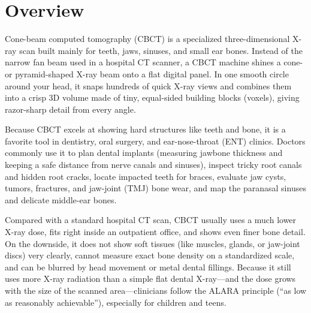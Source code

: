 \label{ch:infographic-cbct}

\section{Overview}

Cone-beam computed tomography (CBCT) is a specialized three-dimensional X-ray scan built mainly for teeth, jaws, sinuses, and small ear bones. Instead of the narrow fan beam used in a hospital CT scanner, a CBCT machine shines a cone- or pyramid-shaped X-ray beam onto a flat digital panel. In one smooth circle around your head, it snaps hundreds of quick X-ray views and combines them into a crisp 3D volume made of tiny, equal-sided building blocks (voxels), giving razor-sharp detail from every angle.

Because CBCT excels at showing hard structures like teeth and bone, it is a favorite tool in dentistry, oral surgery, and ear-nose-throat (ENT) clinics. Doctors commonly use it to plan dental implants (measuring jawbone thickness and keeping a safe distance from nerve canals and sinuses), inspect tricky root canals and hidden root cracks, locate impacted teeth for braces, evaluate jaw cysts, tumors, fractures, and jaw-joint (TMJ) bone wear, and map the paranasal sinuses and delicate middle-ear bones.

Compared with a standard hospital CT scan, CBCT usually uses a much lower X-ray dose, fits right inside an outpatient office, and shows even finer bone detail. On the downside, it does not show soft tissues (like muscles, glands, or jaw-joint discs) very clearly, cannot measure exact bone density on a standardized scale, and can be blurred by head movement or metal dental fillings. Because it still uses more X-ray radiation than a simple flat dental X-ray---and the dose grows with the size of the scanned area---clinicians follow the ALARA principle (``as low as reasonably achievable''), especially for children and teens.

